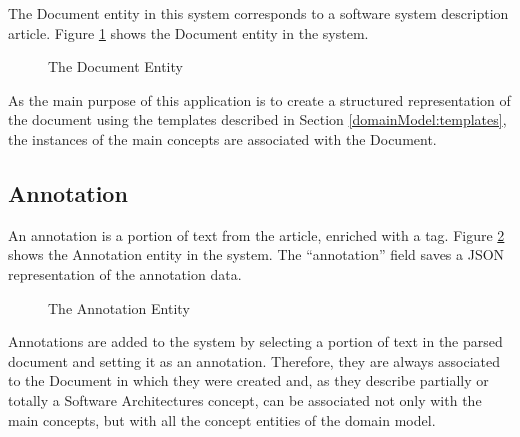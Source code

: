 \documentclass{llncs}
\begin{document}
The Document entity in this system corresponds to a software system description article. Figure \ref{figure:documentEntity} shows the Document entity in the system.
\begin{figure}[ht]
\centering
\renewcommand {\umltextcolor}{black}
\renewcommand {\umlfillcolor}{none}
\renewcommand {\umldrawcolor}{black}

\caption{The Document Entity}
\label{figure:documentEntity}
\end{figure}

As the main purpose of this application is to create a structured representation of the document using the templates described in Section \ref{domainModel:templates}, the instances of the main concepts are associated with the Document.  

\subsection{Annotation}
\label{architecture:annotation}

An annotation is a portion of text from the article, enriched with a tag. Figure \ref{figure:annotationEntity} shows the Annotation entity in the system. The ``annotation'' field saves a JSON representation of the annotation data.
\begin{figure}[ht]
\centering
\renewcommand {\umltextcolor}{black}
\renewcommand {\umlfillcolor}{none}
\renewcommand {\umldrawcolor}{black}

\caption{The Annotation Entity}
\label{figure:annotationEntity}
\end{figure}
Annotations are added to the system by selecting a portion of text in the parsed document and setting it as an annotation. Therefore, they are always associated to the Document in which they were created and, as they describe partially or totally a Software Architectures concept, can be associated not only with the main concepts, but with all the concept entities of the domain model. 
\end{document}
